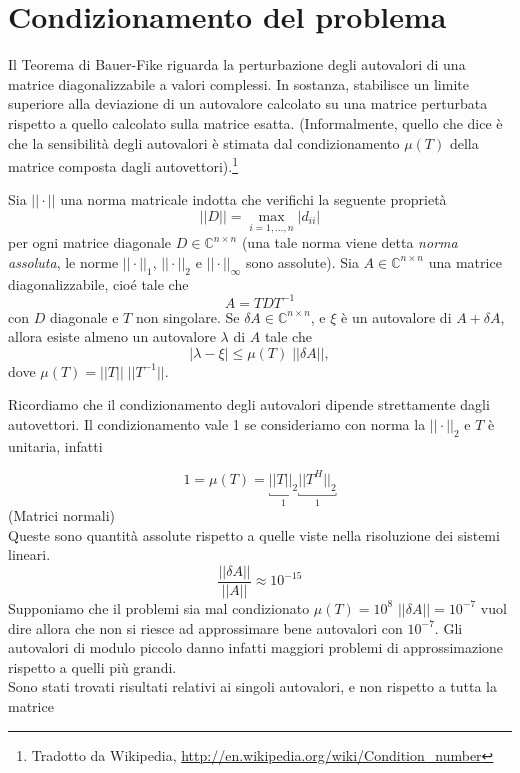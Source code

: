 \section{Condizionamento del problema}
Il Teorema di Bauer-Fike riguarda la perturbazione degli autovalori di una matrice diagonalizzabile a valori complessi. In sostanza, stabilisce un limite superiore alla deviazione di un autovalore calcolato su una matrice perturbata rispetto a quello calcolato sulla matrice esatta. (Informalmente, quello che dice è che la sensibilità degli autovalori è stimata dal condizionamento $\mu(T)$ della matrice composta dagli autovettori).\footnote{Tradotto da Wikipedia, \url{http://en.wikipedia.org/wiki/Condition_number}} 

\begin{theo}
 Sia $ || \cdot ||$ una norma matricale indotta che verifichi la seguente
 propriet\`a
 $$ || D || = \displaystyle \max_{i=1, \ldots, n} |d_{ii}|$$
per ogni matrice diagonale $D \in \mathbb{C}^{n \times n}$
 (una tale norma viene detta \emph{norma assoluta},
 le norme $||\cdot||_{1}$, $ || \cdot ||_{2}$ e $|| \cdot ||_{\infty}  $
sono assolute). Sia $A \in \mathbb{C}^{n \times n}$
 una matrice diagonalizzabile, cio\'e tale che
 $$ A = TDT^{-1}$$
con $D$ diagonale e $T$ non singolare. 
Se $\delta A \in \mathbb{C}^{n \times n}$,
 e $\xi$ \`e  un autovalore di
$A + \delta A$, allora esiste almeno un autovalore $\lambda$ di $A$ tale che
$$ | \lambda - \xi | \leq \mu(T) \; || \delta A||,$$
dove $\mu(T) = ||T|| \; ||T^{-1}||$.
\end{theo}

Ricordiamo che il condizionamento degli autovalori dipende strettamente dagli autovettori.
Il condizionamento vale 1 se consideriamo con norma la $|| \cdot ||_2$ e $T$ \`e unitaria, infatti

$$ 1 = \mu(T) = \underbracket{||T||_{2}}_{1} \underbracket{||T^{H}||_{2}}_{1}$$
(Matrici normali) \\
Queste sono quantit\`a assolute rispetto a quelle viste nella risoluzione dei sistemi lineari.
$$
\dfrac{||\delta A||}{||A||} \approx 10^{-15}
$$
Supponiamo che il problemi sia mal condizionato
$\mu(T) = 10^8$ $||\delta A || =10^{-7}$
vuol dire allora che non si riesce ad approssimare bene
autovalori con $10^{-7}$. Gli autovalori di modulo
 piccolo danno infatti maggiori problemi di approssimazione
rispetto a quelli pi\`u grandi.  \\
Sono stati trovati risultati relativi ai singoli autovalori,
e non rispetto a tutta la matrice

